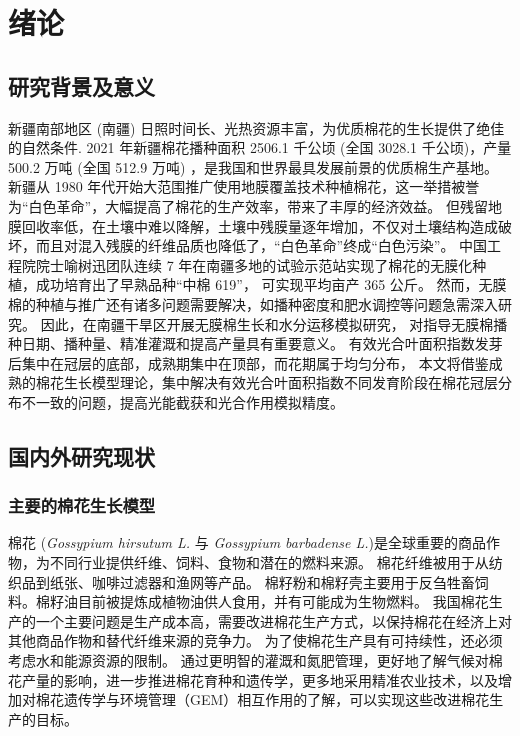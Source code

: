 \chapter{绪论}\label{chap:intro}
\section{研究背景及意义}
新疆南部地区 (南疆) 日照时间长、光热资源丰富，为优质棉花的生长提供了绝佳的自然条件.
2021 年新疆棉花播种面积 2506.1 千公顷 (全国 3028.1 千公顷)，产量 500.2 万吨 (全国 512.9 万吨) \cite{国家统计局关于2021年棉花产量的公告}，是我国和世界最具发展前景的优质棉生产基地。
新疆从 1980 年代开始大范围推广使用地膜覆盖技术种植棉花，这一举措被誉为“白色革命”，大幅提高了棉花的生产效率，带来了丰厚的经济效益。%
但残留地膜回收率低，在土壤中难以降解，土壤中残膜量逐年增加，不仅对土壤结构造成破坏，而且对混入残膜的纤维品质也降低了，“白色革命”终成“白色污染”。
中国工程院院士喻树迅团队连续 7 年在南疆多地的试验示范站实现了棉花的无膜化种植，成功培育出了早熟品种“中棉 619”，%
可实现平均亩产 365 公斤\cite{yu2019}。
然而，无膜棉的种植与推广还有诸多问题需要解决，如播种密度和肥水调控等问题急需深入研究。
因此，在南疆干旱区开展无膜棉生长和水分运移模拟研究，%
对指导无膜棉播种日期、播种量、精准灌溉和提高产量具有重要意义。
有效光合叶面积指数发芽后集中在冠层的底部，成熟期集中在顶部，而花期属于均匀分布，%
本文将借鉴成熟的棉花生长模型理论，集中解决有效光合叶面积指数不同发育阶段在棉花冠层分布不一致的问题，提高光能截获和光合作用模拟精度。

\section{国内外研究现状}
\subsection{主要的棉花生长模型}
棉花 (\textit{Gossypium hirsutum L.} 与 \textit{Gossypium barbadense L.})是全球重要的商品作物，为不同行业提供纤维、饲料、食物和潜在的燃料来源。%
棉花纤维被用于从纺织品到纸张、咖啡过滤器和渔网等产品。%
棉籽粉和棉籽壳主要用于反刍牲畜饲料。棉籽油目前被提炼成植物油供人食用，并有可能成为生物燃料。%
我国棉花生产的一个主要问题是生产成本高，需要改进棉花生产方式，以保持棉花在经济上对其他商品作物和替代纤维来源的竞争力。%
为了使棉花生产具有可持续性，还必须考虑水和能源资源的限制。%
通过更明智的灌溉和氮肥管理，更好地了解气候对棉花产量的影响，进一步推进棉花育种和遗传学，更多地采用精准农业技术，以及增加对棉花遗传学与环境管理（GEM）相互作用的了解，可以实现这些改进棉花生产的目标。

